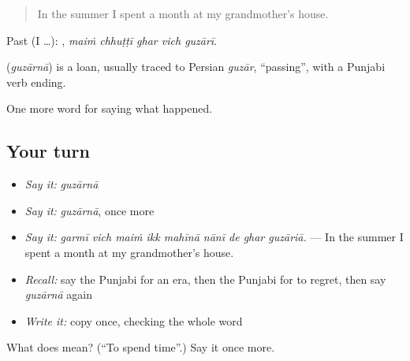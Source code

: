 \begin{quote}
In the summer I spent a month at my grandmother's house.
\end{quote}

Past (I …):     , \emph{maiṁ chhuṭṭī ghar vich guzārī}.

\begin{cousinweb}
\textbf{} (\emph{guzārnā}) is a loan, usually traced to Persian \emph{guzār}, \textquotedblleft{}passing\textquotedblright{}, with a Punjabi verb ending.
\end{cousinweb}

\begin{grammarlens}[title={What you've built}]
One more word for saying what happened.
\end{grammarlens}

\subsection*{Your turn}
\begin{itemize}
\raggedright
  \item \emph{Say it:} \emph{guzārnā}
  \item \emph{Say it:} \emph{guzārnā}, once more
  \item \emph{Say it:} \emph{garmī vich maiṁ ikk mahīnā nānī de ghar guzāriā.} — In the summer I spent a month at my grandmother's house.
  \item \emph{Recall:} say the Punjabi for an era, then the Punjabi for to regret, then say \emph{guzārnā} again
  \item \emph{Write it:} copy \textbf{} once, checking the whole word
\end{itemize}

\begin{tcolorbox}[breakable,colback=teal!4,colframe=teal!35!black,title={Before you move on}]
What does  mean? (\textquotedblleft{}To spend time\textquotedblright{}.) Say it once more.
\end{tcolorbox}
